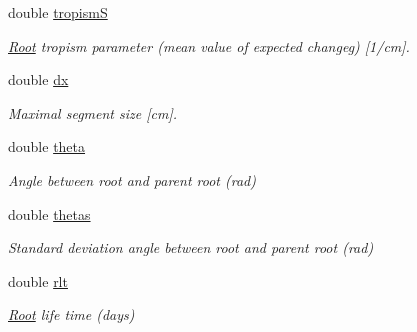 \begin{DoxyCompactItemize}
\mbox{\label{classCPlantBox_1_1LeafRandomOrganParameter_a797487f184e9c1858b3c6212be7f7ba9}} 
double \hyperlink{classCPlantBox_1_1LeafRandomOrganParameter_a797487f184e9c1858b3c6212be7f7ba9}{tropismS}
\begin{DoxyCompactList}\small\item\em \hyperlink{classCPlantBox_1_1Root}{Root} tropism parameter (mean value of expected changeg) \mbox{[}1/cm\mbox{]}. \end{DoxyCompactList}\item 
\mbox{\label{classCPlantBox_1_1LeafRandomOrganParameter_aefe6ab16a3480801630b0888c0ef59ef}} 
double \hyperlink{classCPlantBox_1_1LeafRandomOrganParameter_aefe6ab16a3480801630b0888c0ef59ef}{dx}
\begin{DoxyCompactList}\small\item\em Maximal segment size \mbox{[}cm\mbox{]}. \end{DoxyCompactList}\item 
\mbox{\label{classCPlantBox_1_1LeafRandomOrganParameter_a683dd7317306ca00098aac32869f7ae1}} 
double \hyperlink{classCPlantBox_1_1LeafRandomOrganParameter_a683dd7317306ca00098aac32869f7ae1}{theta}
\begin{DoxyCompactList}\small\item\em Angle between root and parent root (rad) \end{DoxyCompactList}\item 
\mbox{\label{classCPlantBox_1_1LeafRandomOrganParameter_a4fa4931756d3ea5745548a47fd8acf9d}} 
double \hyperlink{classCPlantBox_1_1LeafRandomOrganParameter_a4fa4931756d3ea5745548a47fd8acf9d}{thetas}
\begin{DoxyCompactList}\small\item\em Standard deviation angle between root and parent root (rad) \end{DoxyCompactList}\item 
\mbox{\label{classCPlantBox_1_1LeafRandomOrganParameter_a68f4c1fd6edf01d8da75a8dc39559e51}} 
double \hyperlink{classCPlantBox_1_1LeafRandomOrganParameter_a68f4c1fd6edf01d8da75a8dc39559e51}{rlt}
\begin{DoxyCompactList}\small\item\em \hyperlink{classCPlantBox_1_1Root}{Root} life time (days) \end{DoxyCompactList}\item 

\end{DoxyCompactItemize}
